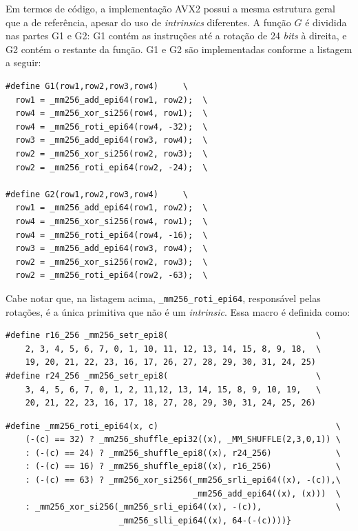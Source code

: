 \documentclass{article}
\begin{document}
Em termos de código, a implementação AVX2 possui a mesma estrutura
geral que a de referência, apesar do uso de \emph{intrinsics}
diferentes. A função $G$ é dividida nas partes G1 e G2: G1 contém as
instruções até a rotação de 24 \emph{bits} à direita, e G2 contém o restante da
função. G1 e G2 são implementadas conforme a listagem a seguir:

\begin{small}
\begin{verbatim}
#define G1(row1,row2,row3,row4)		\
  row1 = _mm256_add_epi64(row1, row2);	\
  row4 = _mm256_xor_si256(row4, row1);	\
  row4 = _mm256_roti_epi64(row4, -32);	\
  row3 = _mm256_add_epi64(row3, row4);	\
  row2 = _mm256_xor_si256(row2, row3);	\
  row2 = _mm256_roti_epi64(row2, -24);	\

#define G2(row1,row2,row3,row4)		\
  row1 = _mm256_add_epi64(row1, row2);	\
  row4 = _mm256_xor_si256(row4, row1);	\
  row4 = _mm256_roti_epi64(row4, -16);	\
  row3 = _mm256_add_epi64(row3, row4);	\
  row2 = _mm256_xor_si256(row2, row3);	\
  row2 = _mm256_roti_epi64(row2, -63);	\
\end{verbatim}
\end{small}

Cabe notar que, na listagem acima, \texttt{\_mm256\_roti\_epi64},
responsável pelas rotações, é a única primitiva que não é um
\emph{intrinsic}. Essa macro é definida como:

\begin{small}
\begin{verbatim}
#define r16_256 _mm256_setr_epi8(                              \
    2, 3, 4, 5, 6, 7, 0, 1, 10, 11, 12, 13, 14, 15, 8, 9, 18,  \
    19, 20, 21, 22, 23, 16, 17, 26, 27, 28, 29, 30, 31, 24, 25)
#define r24_256 _mm256_setr_epi8(                              \
    3, 4, 5, 6, 7, 0, 1, 2, 11,12, 13, 14, 15, 8, 9, 10, 19,   \
    20, 21, 22, 23, 16, 17, 18, 27, 28, 29, 30, 31, 24, 25, 26)
\end{verbatim}
\end{small}
\newpage
\begin{small}
\begin{verbatim}
#define _mm256_roti_epi64(x, c)                                    \
    (-(c) == 32) ? _mm256_shuffle_epi32((x), _MM_SHUFFLE(2,3,0,1)) \
    : (-(c) == 24) ? _mm256_shuffle_epi8((x), r24_256)             \
    : (-(c) == 16) ? _mm256_shuffle_epi8((x), r16_256)             \
    : (-(c) == 63) ? _mm256_xor_si256(_mm256_srli_epi64((x), -(c)),\
                                      _mm256_add_epi64((x), (x)))  \
    : _mm256_xor_si256(_mm256_srli_epi64((x), -(c)),               \
                       _mm256_slli_epi64((x), 64-(-(c))))}
\end{verbatim}
\end{small}
\end{document}
